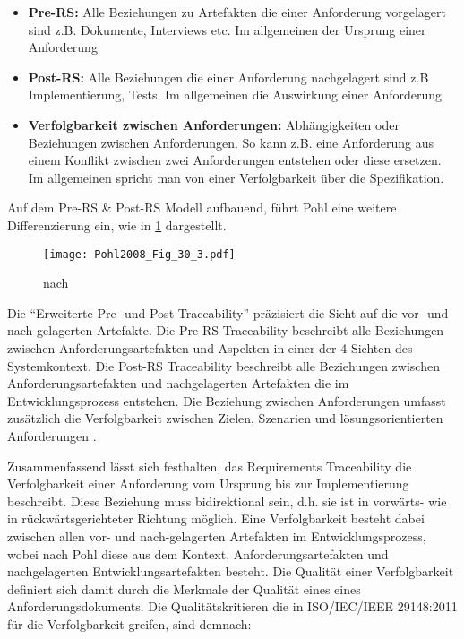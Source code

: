 \begin{itemize}
    \item \textbf{Pre-RS:} Alle Beziehungen zu Artefakten die einer Anforderung vorgelagert sind z.B. Dokumente, Interviews etc. Im allgemeinen der Ursprung einer Anforderung
    \item \textbf{Post-RS:} Alle Beziehungen die einer Anforderung nachgelagert sind z.B Implementierung, Tests. Im allgemeinen die Auswirkung einer Anforderung
    \item \textbf{Verfolgbarkeit zwischen Anforderungen:} Abhängigkeiten oder Beziehungen zwischen Anforderungen. So kann z.B. eine Anforderung aus einem Konflikt zwischen zwei Anforderungen entstehen oder diese ersetzen. Im allgemeinen spricht man von einer Verfolgbarkeit über die Spezifikation. \cite{Pohl2015BasiswissenIREB-Standard}
\end{itemize}

Auf dem Pre-RS \& Post-RS Modell aufbauend, führt Pohl eine weitere Differenzierung ein, wie in \ref{fig:abb_requirementstechniken} dargestellt.

\begin{figure}[!htb]
  \centering
  \texttt{[image: Pohl2008\_Fig\_30\_3.pdf]}
  \caption{nach \cite[Fig. 30.3]{Pohl2008RequirementsTechniken}}
  \label{fig:abb_requirementstechniken}
\end{figure}

Die \enquote{Erweiterte Pre- und Post-Traceability} präzisiert die Sicht auf die vor- und nach-gelagerten Artefakte. Die Pre-RS Traceability beschreibt alle Beziehungen zwischen Anforderungsartefakten und Aspekten in einer der 4 Sichten des Systemkontext. Die Post-RS Traceability beschreibt alle Beziehungen zwischen Anforderungsartefakten und nachgelagerten Artefakten die im Entwicklungsprozess entstehen. Die Beziehung zwischen Anforderungen umfasst zusätzlich die Verfolgbarkeit zwischen Zielen, Szenarien und lösungsorientierten Anforderungen \cite{Pohl2008RequirementsTechniken}.

Zusammenfassend lässt sich festhalten, das Requirements Traceability die Verfolgbarkeit einer Anforderung vom Ursprung bis zur Implementierung beschreibt. Diese Beziehung muss bidirektional sein, d.h. sie ist in vorwärts- wie in rückwärtsgerichteter Richtung möglich. Eine Verfolgbarkeit besteht dabei zwischen allen vor- und nach-gelagerten Artefakten im Entwicklungsprozess, wobei nach Pohl diese aus dem Kontext, Anforderungsartefakten und nachgelagerten Entwicklungsartefakten besteht. Die Qualität einer Verfolgbarkeit definiert sich damit durch die Merkmale der Qualität eines eines Anforderungsdokuments. Die Qualitätskritieren die in ISO/IEC/IEEE 29148:2011 für die Verfolgbarkeit greifen, sind demnach:

